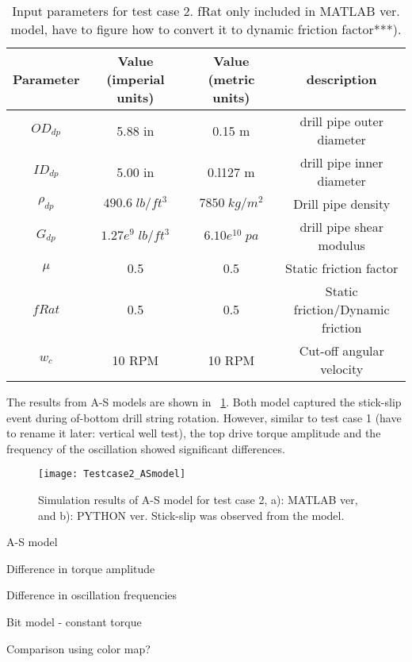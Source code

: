  \begin{table}[!hbt]
\centering
\begin{tabular}{|c|c|c|c|}
\hline
Parameter & Value (imperial units) & Value (metric units) & description\\                                                              
\hline
$OD_{dp}$ & 5.88 in & 0.15 m & drill pipe outer diameter\\                                                       
\hline
$ID_{dp}$ & 5.00 in & 0.l127 m & drill pipe inner diameter  \\                                                      
\hline
$\rho_{dp}$ & $490.6\;lb/ft^3$ & $7850\;kg/m^2$ & Drill pipe density \\                                                  
\hline
$G_{dp}$ & $1.27e^{9}\;lb/ft^3$ & $6.10e^{10}\;pa$ & drill pipe shear modulus\\                                                              
\hline
$\mu$ & 0.5 & 0.5 & Static friction factor\\
\hline
$fRat$ & 0.5 & 0.5 & Static friction/Dynamic friction\\
\hline
$w_c$ & 10 RPM & 10 RPM & Cut-off angular velocity\\
\hline
\end{tabular}
\caption[Input parameters for test case 2.]{Input parameters for test case 2. fRat only included in MATLAB ver. model, have to figure how to convert it to dynamic friction factor***).}\label{table_Inclinedwell_input}
\end{table}

The results from A-S models are shown in \figurename~\ref{figure_testcase2_ASmodel}. Both model captured the stick-slip event during of-bottom drill string rotation. However, similar to test case 1 (have to rename it later: vertical well test), the top drive torque amplitude and the frequency of the oscillation showed significant differences.
 
\begin{figure}[!hbt]
  \centering
  \texttt{[image: Testcase2\_ASmodel]}
  \caption[Result from A-S model. (test case 2)]{Simulation results of A-S model for test case 2, a): MATLAB ver, and b): PYTHON ver. Stick-slip was observed from the model.}\label{figure_testcase2_ASmodel}
\end{figure}


A-S model
\begin{numberedlist}
	\item Difference in torque amplitude
	\item Difference in oscillation frequencies
	\item Bit model - constant torque
	\item Comparison using color map?
\end{numberedlist}

